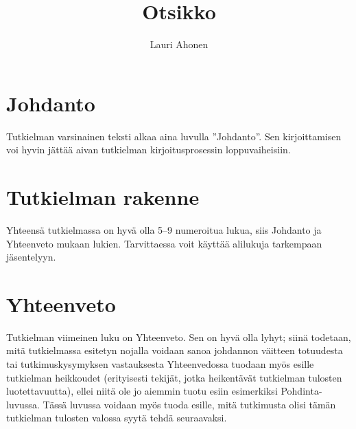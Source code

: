 \documentclass[utf8,bachelor] {gradu3}
\begin{document}
\title{Otsikko}

\author{Lauri Ahonen}

\maketitle

\mainmatter

\chapter{Johdanto}

Tutkielman varsinainen teksti alkaa aina luvulla ''Johdanto''.  Sen
kirjoittamisen voi hyvin jättää aivan tutkielman kirjoitusprosessin
loppuvaiheisiin.

\chapter{Tutkielman rakenne}

Yhteensä tutkielmassa on hyvä olla 5--9 numeroitua
lukua, siis Johdanto ja Yhteenveto mukaan lukien.  Tarvittaessa voit
käyttää alilukuja tarkempaan jäsentelyyn.\parencite{mustafa2023psychological}

\chapter{Yhteenveto}
Tutkielman viimeinen luku on Yhteenveto.  Sen on hyvä olla lyhyt;
siinä todetaan, mitä tutkielmassa esitetyn nojalla voidaan sanoa
johdannon väitteen totuudesta tai tutkimuskysymyksen vastauksesta
Yhteenvedossa tuodaan myös esille tutkielman heikkoudet (erityisesti
tekijät, jotka heikentävät tutkielman tulosten luotettavuutta), ellei
niitä ole jo aiemmin tuotu esiin esimerkiksi Pohdinta-luvussa.  Tässä
luvussa voidaan myös tuoda esille, mitä tutkimusta olisi tämän
tutkielman tulosten valossa syytä tehdä seuraavaksi.\parencite{ozccetin2019relationships}

\printbibliography
\end{document}
